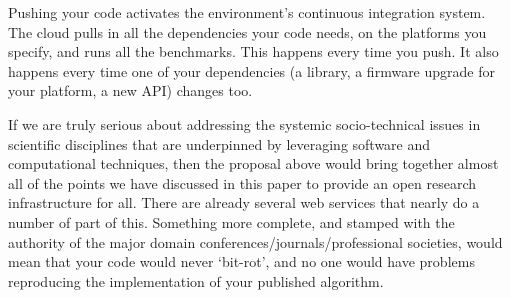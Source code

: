 \documentclass[a4paper,11pt]{article}
\begin{document}
Pushing your code activates the environment's continuous integration
system.  The cloud pulls in all the dependencies your code needs, on
the platforms you specify, and runs all the benchmarks. This happens
every time you push. It also happens every time one of your
dependencies (a library, a firmware upgrade for your platform, a new
API) changes too.

If we are truly serious about addressing the systemic socio-technical
issues in scientific disciplines that are underpinned by leveraging
software and computational techniques, then the proposal above would
bring together almost all of the points we have discussed in this
paper to provide an open research infrastructure for all. There are
already several web services that nearly do a number of part of
this. Something more complete, and stamped with the authority of the
major domain conferences/journals/professional societies, would mean
that your code would never `bit-rot', and no one would have problems
reproducing the implementation of your published algorithm.




\end{document}
